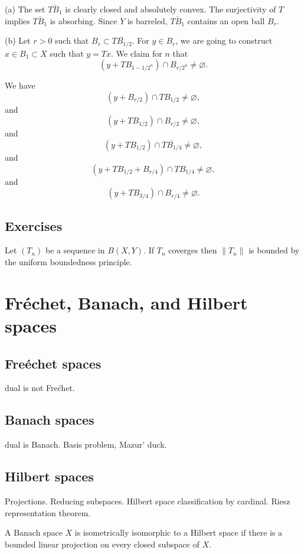 \documentclass{../note}
\begin{document}
\begin{pf}
(a)
The set $\bar{TB_1}$ is clearly closed and absolutely convex.
The surjectivity of $T$ implies $\bar{TB_1}$ is absorbing.
Since $Y$ is barreled, $\bar{TB_1}$ contains an open ball $B_r$.

(b)
Let $r>0$ such that $B_r\subset\bar{TB_{1/2}}$.
For $y\in B_r$, we are going to construct $x\in B_1\subset X$ such that $y=Tx$.
We claim for $n$ that
\[(y+TB_{1-1/2^n})\cap B_{r/2^n}\ne\varnothing.\]

We have
\[(y+B_{r/2})\cap TB_{1/2}\ne\varnothing,\]
and
\[(y+TB_{1/2})\cap B_{r/2}\ne\varnothing,\]
and
\[(y+TB_{1/2})\cap\bar{TB_{1/4}}\ne\varnothing,\]
and
\[(y+TB_{1/2}+B_{r/4})\cap TB_{1/4}\ne\varnothing,\]
and
\[(y+TB_{3/4})\cap B_{r/4}\ne\varnothing.\]
\end{pf}


\section*{Exercises}

\begin{prb}
Let $(T_n)$ be a sequence in $B(X,Y)$.
If $T_n$ coverges then $\|T_n\|$ is bounded by the uniform boundedness principle.
\end{prb}






\chapter{Fr\'echet, Banach, and Hilbert spaces}

\section{Fre\'echet spaces}
dual is not Fre\'chet.

\section{Banach spaces}
dual is Banach.
Basis problem, Mazur' duck.

\section{Hilbert spaces}
Projections. Reducing subspaces.
Hilbert space classification by cardinal.
Riesz representation theorem.
\begin{prb}
\begin{parts}
\item A Banach space $X$ is isometrically isomorphic to a Hilbert space if there is a bounded linear projection on every closed subspace of $X$.
\end{parts}
\end{prb}
\end{document}
